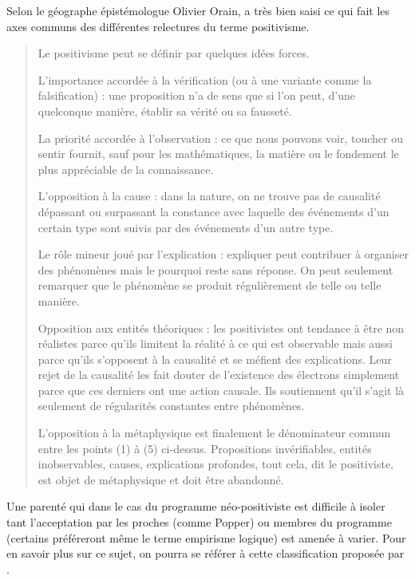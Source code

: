 Selon le géographe épistémologue Olivier Orain, \textcite{Hacking1989} a très bien saisi ce qui fait les axes communs des différentes relectures du terme positivisme.

\blockquote[{\cite[82]{Hacking1989}}]{Le positivisme peut se définir par quelques idées forces. \begin{enumerate*}[label=(\arabic*)] \item L’importance accordée à la vérification (ou à une variante comme la falsification) : une proposition n’a de sens que si l’on peut, d’une quelconque manière, établir sa vérité ou sa fausseté. \item La priorité accordée à l’observation : ce que nous pouvons voir, toucher ou sentir fournit, sauf pour les mathématiques, la matière ou le fondement le plus appréciable de la connaissance. \item L’opposition à la cause : dans la nature, on ne trouve pas de causalité dépassant ou surpassant la constance avec laquelle des événements d’un certain type sont suivis par des événements d’un autre type. \item Le rôle mineur joué par l’explication : expliquer peut contribuer à organiser des phénomènes mais le pourquoi reste sans réponse. On peut seulement remarquer que le phénomène se produit régulièrement de telle ou telle manière. \item Opposition aux entités théoriques : les positivistes ont tendance à être non réalistes parce qu’ils limitent la réalité à ce qui est observable mais aussi parce qu’ils s’opposent à la causalité et se méfient des explications. Leur rejet de la causalité les fait douter de l’existence des électrons simplement parce que ces derniers ont une action causale. Ils soutiennent qu’il s’agit là seulement de régularités constantes entre phénomènes. \item L’opposition à la métaphysique est finalement le dénominateur commun entre les points (1) à (5) ci-dessus. Propositions invérifiables, entités inobservables, causes, explications profondes, tout cela, dit le positiviste, est objet de métaphysique et doit être abandonné.\end{enumerate*}}

Une parenté qui dans le cas du programme néo-positiviste est difficile à isoler tant l'acceptation par les proches (comme Popper) ou membres du programme (certains préféreront même le terme empirisme logique) est amenée à varier. Pour en savoir plus sur ce sujet, on pourra se référer à cette classification proposée par \textcite[81-86]{Hacking1989}.

